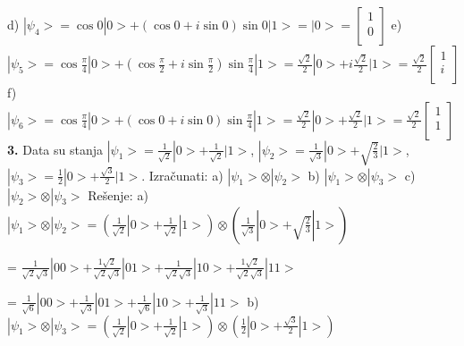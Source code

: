 \documentclass{article}
\begin{document}
\vspace{0.2cm}\newline
d) $|\psi_4> = \cos{0}|0> + (\cos{0} + i\sin{0})\sin{0}|1> = |0> = \begin{bmatrix}
    1\\
    0\\
\end{bmatrix}$
\vspace{0.2cm}\newline
e) $|\psi_5> = \cos{\frac{\pi}{4}}|0> + (\cos{\frac{\pi}{2}} + i\sin{\frac{\pi}{2}})\sin{\frac{\pi}{4}}|1> = \frac{\sqrt{2}}{2}|0> + i\frac{\sqrt{2}}{2}|1> = \frac{\sqrt{2}}{2}\begin{bmatrix}
    1\\
    i\\
\end{bmatrix}$
\vspace{0.2cm}\newline
f) $|\psi_6> = \cos{\frac{\pi}{4}}|0> + (\cos{0} + i\sin{0})\sin{\frac{\pi}{4}}|1> = \frac{\sqrt{2}}{2}|0> + \frac{\sqrt{2}}{2}|1> = \frac{\sqrt{2}}{2}\begin{bmatrix}
    1\\
    1\\
\end{bmatrix}$
\vspace{0.4cm}\newline
\textbf{3.} Data su stanja $|\psi_1> = \frac{1}{\sqrt{2}}|0>+\frac{1}{\sqrt{2}}|1>$, $|\psi_2> = \frac{1}{\sqrt{3}}|0>+\sqrt{\frac{2}{3}}|1>$, $|\psi_3> = \frac{1}{2}|0>+\frac{\sqrt{3}}{2}|1>$. Izračunati: \vspace{0.2cm}\newline
 a) $|\psi_1>\otimes|\psi_2>$
 \hspace*{1cm}b) $|\psi_1>\otimes|\psi_3>$
 \hspace*{1cm}c) $|\psi_2>\otimes|\psi_3>$
\vspace*{0.4cm}\newline 
Rešenje: \vspace{0.2cm}\newline
a) $|\psi_1>\otimes|\psi_2> = (\frac{1}{\sqrt{2}}|0>+\frac{1}{\sqrt{2}}|1>)\otimes(\frac{1}{\sqrt{3}}|0>+\sqrt{\frac{2}{3}}|1>) $

= $\frac{1}{\sqrt{2}\sqrt{3}}|00> + \frac{1\sqrt{2}}{\sqrt{2}\sqrt{3}}|01> + \frac{1}{\sqrt{2}\sqrt{3}}|10> + \frac{1\sqrt{2}}{\sqrt{2}\sqrt{3}}|11>$
\vspace{0.1cm}

= $\frac{1}{\sqrt{6}}|00> + \frac{1}{\sqrt{3}}|01> + \frac{1}{\sqrt{6}}|10> + \frac{1}{\sqrt{3}}|11>$
\vspace{0.3cm}\newline
b) $|\psi_1>\otimes|\psi_3> = (\frac{1}{\sqrt{2}}|0>+\frac{1}{\sqrt{2}}|1>)\otimes(\frac{1}{2}|0>+\frac{\sqrt{3}}{2}|1>)$
\end{document}
